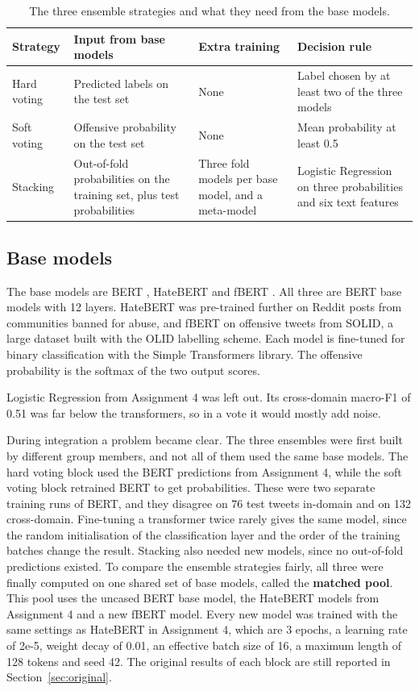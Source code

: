 \documentclass[11pt,a4paper]{article}
\begin{document}
\begin{table}[H]
\centering
\caption{The three ensemble strategies and what they need from the base models.}
\label{tab:methods}
\begin{tabular}{L{2.3cm}L{4.0cm}L{3.6cm}L{4.0cm}}
\toprule
Strategy & Input from base models & Extra training & Decision rule \\
\midrule
Hard voting & Predicted labels on the test set & None & Label chosen by at least two of the three models \\
Soft voting & Offensive probability on the test set & None & Mean probability at least 0.5 \\
Stacking & Out-of-fold probabilities on the training set, plus test probabilities & Three fold models per base model, and a meta-model & Logistic Regression on three probabilities and six text features \\
\bottomrule
\end{tabular}
\end{table}

\subsection{Base models}

The base models are BERT \citep{devlin2019bert}, HateBERT \citep{caselli2021hatebert} and fBERT \citep{sarkar2021fbert}. All three are BERT base models with 12 layers. HateBERT was pre-trained further on Reddit posts from communities banned for abuse, and fBERT on offensive tweets from SOLID, a large dataset built with the OLID labelling scheme. Each model is fine-tuned for binary classification with the Simple Transformers library. The offensive probability is the softmax of the two output scores.

Logistic Regression from Assignment 4 was left out. Its cross-domain macro-F1 of 0.51 was far below the transformers, so in a vote it would mostly add noise.

During integration a problem became clear. The three ensembles were first built by different group members, and not all of them used the same base models. The hard voting block used the BERT predictions from Assignment 4, while the soft voting block retrained BERT to get probabilities. These were two separate training runs of BERT, and they disagree on 76 test tweets in-domain and on 132 cross-domain. Fine-tuning a transformer twice rarely gives the same model, since the random initialisation of the classification layer and the order of the training batches change the result. Stacking also needed new models, since no out-of-fold predictions existed. To compare the ensemble strategies fairly, all three were finally computed on one shared set of base models, called the \textbf{matched pool}. This pool uses the uncased BERT base model, the HateBERT models from Assignment 4 and a new fBERT model. Every new model was trained with the same settings as HateBERT in Assignment 4, which are 3 epochs, a learning rate of 2e-5, weight decay of 0.01, an effective batch size of 16, a maximum length of 128 tokens and seed 42. The original results of each block are still reported in Section~\ref{sec:original}.
\end{document}

